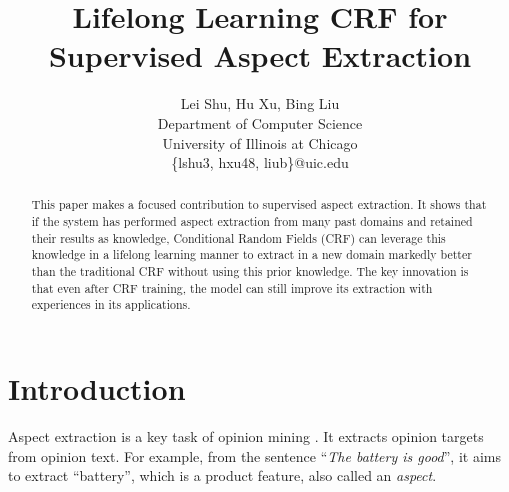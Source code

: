 \documentclass[11pt,a4paper]{article}
\title{Lifelong Learning CRF for Supervised Aspect Extraction}
\author{Lei Shu, Hu Xu, Bing Liu\\
    Department of Computer Science\\
    University of Illinois at Chicago\\
    \{lshu3, hxu48, liub\}@uic.edu
}
\date{}
\theoremstyle{definition}
\begin{document}
\maketitle
\begin{abstract}
This paper makes a focused contribution to supervised aspect extraction. It shows that if the system has performed aspect extraction from many past domains and retained their results as knowledge, Conditional Random Fields (CRF) can leverage this knowledge in a lifelong learning manner to extract in a new domain markedly better than the traditional CRF without using this prior knowledge. The key innovation is that even after CRF training, the model can still improve its extraction with experiences in its applications. 

\end{abstract}

\section{Introduction}
\label{sec:introduction}
Aspect extraction is a key task of opinion mining \cite{Liu2012}. It extracts opinion targets from opinion text. For example, from the sentence ``\emph{The battery is good}'', it aims to extract ``battery'', which is a product feature, also called an {\em aspect}. %
\end{document}

